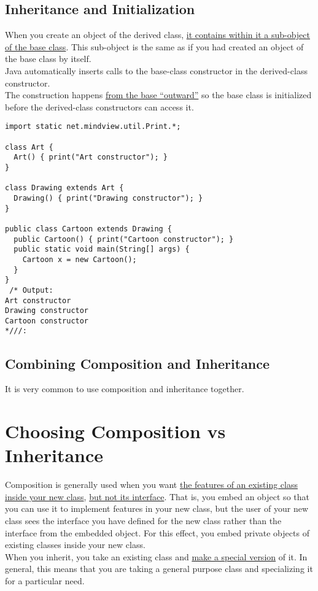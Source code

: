\documentclass[10pt,letterpaper]{report}
\begin{document}
\subsection{Inheritance and Initialization}
When you create an object of the derived class, \underline{it contains within it a sub-object} \underline{of the base class}. This sub-object is the same as if you had created an object of the base class by itself.\\

Java automatically inserts calls to the base-class constructor in the derived-class constructor.\\

The construction happens \underline{from the base ``outward''} so the base class is initialized before the derived-class constructors can access it.
\begin{lstlisting}
import static net.mindview.util.Print.*;

class Art {
  Art() { print("Art constructor"); }
}

class Drawing extends Art {
  Drawing() { print("Drawing constructor"); }
}

public class Cartoon extends Drawing {
  public Cartoon() { print("Cartoon constructor"); }
  public static void main(String[] args) {
    Cartoon x = new Cartoon();
  }
}
 /* Output:
Art constructor
Drawing constructor
Cartoon constructor
*///:
\end{lstlisting}
\subsection{Combining Composition and Inheritance}
It is very common to use composition and inheritance together.
\section{Choosing Composition vs Inheritance}
Composition is generally used when you want \underline{the features of an existing class} \underline{inside your new class}, \underline{but not its interface}. That is, you embed an object so that you can use it to implement features in your new class, but the user of your new class sees the interface you have defined for the new class rather than the interface from the embedded object. For this effect, you embed private objects of existing classes inside your new class.\\

When you inherit, you take an existing class and \underline{make a special version} of it. In general, this means that you are taking a general purpose class and specializing it for a particular need.\\
\end{document}
